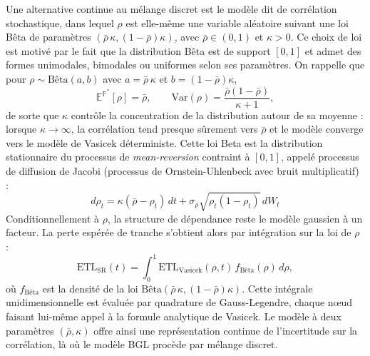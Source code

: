 Une alternative continue au mélange discret est le modèle dit de corrélation stochastique,
dans lequel $\rho$ est elle-même une variable aléatoire suivant une loi Bêta de paramètres
$(\bar{\rho}\,\kappa, (1-\bar{\rho})\kappa)$, avec $\bar{\rho} \in (0,1)$ et $\kappa > 0$. Ce choix
de loi est motivé par le fait que la distribution Bêta est de support $[0,1]$ et
admet des formes unimodales, bimodales ou uniformes selon ses paramètres. On rappelle que pour
$\rho \sim \text{Bêta}(a, b)$ avec $a = \bar{\rho}\,\kappa$ et $b = (1-\bar{\rho})\kappa$,
\begin{equation}
    \mathbb{E}^{\mathbb{P}^\ast}[\rho] = \bar{\rho}, \qquad \mathrm{Var}(\rho) = \frac{\bar{\rho}(1-\bar{\rho})}{\kappa+1},
\end{equation}
de sorte que $\kappa$ contrôle la concentration de la distribution autour de sa moyenne : lorsque
$\kappa \to \infty$, la corrélation tend presque sûrement vers $\bar{\rho}$ et le modèle converge
vers le modèle de Vasicek déterministe. Cette loi Beta est la distribution stationnaire du processus 
de \emph{mean-reversion} contraint à $[0,1]$, appelé processus de diffusion de Jacobi (processus de 
Ornstein-Uhlenbeck avec bruit multiplicatif) :
\begin{equation}
    d\rho_t = \kappa(\bar\rho - \rho_t)\,dt + \sigma_\rho\sqrt{\rho_t(1-\rho_t)}\,dW_t
\end{equation}
Conditionnellement à $\rho$, la structure de dépendance reste le modèle gaussien à un facteur.
La perte espérée de tranche s'obtient alors par intégration sur la loi de $\rho$ :
\begin{equation}
    \mathrm{ETL}_\text{SR}(t) = \int_0^1 \mathrm{ETL}_\text{Vasicek}(\rho, t)\, f_\text{Bêta}(\rho)\, d\rho,
\end{equation}
où $f_\text{Bêta}$ est la densité de la loi $\text{Bêta}(\bar{\rho}\,\kappa, (1-\bar{\rho})\kappa)$.
Cette intégrale unidimensionnelle est évaluée par quadrature de Gauss-Legendre, chaque nœud
faisant lui-même appel à la formule analytique de Vasicek. Le modèle à deux paramètres $(\bar{\rho}, \kappa)$
offre ainsi une représentation continue de l'incertitude sur la corrélation, là où le modèle BGL
procède par mélange discret.
